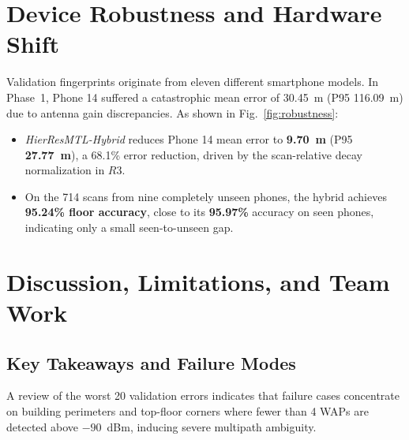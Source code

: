 \documentclass[conference]{IEEEtran}
\begin{document}
\section{Device Robustness and Hardware Shift}
Validation fingerprints originate from eleven different smartphone models. In Phase~1, Phone 14 suffered a catastrophic mean error of 30.45~m (P95 116.09~m) due to antenna gain discrepancies.
As shown in Fig.~\ref{fig:robustness}:
\begin{itemize}
    \item \textit{HierResMTL-Hybrid} reduces Phone 14 mean error to \textbf{9.70~m} (P95 \textbf{27.77~m}), a 68.1\% error reduction, driven by the scan-relative decay normalization in $R3$.
    \item On the 714 scans from nine completely unseen phones, the hybrid achieves \textbf{95.24\% floor accuracy}, close to its \textbf{95.97\%} accuracy on seen phones, indicating only a small seen-to-unseen gap.
\end{itemize}

\section{Discussion, Limitations, and Team Work}

\subsection{Key Takeaways and Failure Modes}
A review of the worst 20 validation errors indicates that failure cases concentrate on building perimeters and top-floor corners where fewer than 4 WAPs are detected above $-90$~dBm, inducing severe multipath ambiguity.
\end{document}
